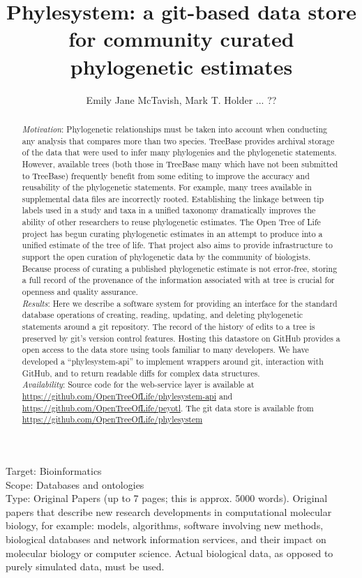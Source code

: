 \documentclass[a4paper,10pt]{article}
\title{Phylesystem: a git-based data store for community curated phylogenetic estimates}
\author{Emily Jane McTavish, Mark T. Holder ... ??}
\begin{document}
\maketitle
Target: Bioinformatics\\
Scope: Databases and ontologies\\
Type: Original Papers (up to 7 pages; this is approx. 5000 words).
Original papers that describe new research developments in computational molecular biology, for example: 
models, algorithms, software involving new methods, biological databases and network information services, and their impact on molecular biology or computer science. 
Actual biological data, as opposed to purely simulated data, must be used.

\begin{abstract}
    {\em Motivation}:
Phylogenetic relationships must be taken into account when conducting any analysis that compares more than two species.
TreeBase provides archival storage of the data that were used to infer many phylogenies and the phylogenetic statements.
However, available trees (both those in TreeBase many which have not been submitted to TreeBase) frequently benefit from some editing
 to improve the accuracy and reusability of the phylogenetic statements.
For example, many trees available in supplemental data files are incorrectly rooted.
Establishing the linkage between tip labels used in a study and taxa in a unified taxonomy dramatically improves the
    ability of other researchers to reuse phylogenetic estimates.
The Open Tree of Life project has begun curating phylogenetic estimates in an attempt to produce into a unified estimate of the tree of life.
That project also aims to provide infrastructure to support the open curation of phylogenetic data by the community of biologists.
Because process of curating a published phylogenetic estimate is not error-free, storing a full record of the provenance of the information
associated with at tree is crucial for openness and quality assurance.\\
{\em Results}:
Here we describe a software system for providing an interface for the standard database operations of creating, reading, updating, and deleting
phylogenetic statements around a git repository.
The record of the history of edits to a tree is preserved by git's version control features.
Hosting this datastore on GitHub provides a open access to the data store using tools familiar to many developers.
We have developed a ``phylesystem-api'' to implement wrappers around git, interaction with GitHub, and to return readable diffs for complex data structures. \\
{\em Availability}:
Source code for the web-service layer is available at \url{https://github.com/OpenTreeOfLife/phylesystem-api}
and \url{https://github.com/OpenTreeOfLife/peyotl}.
The git data store is available from \url{https://github.com/OpenTreeOfLife/phylesystem}
\end{abstract}
\end{document}
